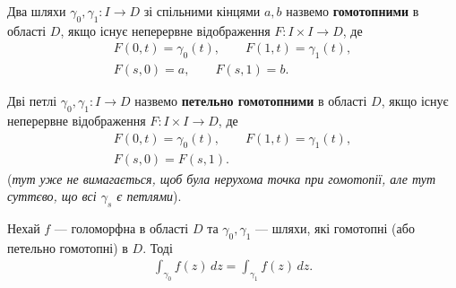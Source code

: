 \documentclass{math_library}
\begin{document}
\begin{definition}
Два шляхи $\gamma_0, \gamma_1 \colon I \to D$ зі спільними кінцями $a,b$ назвемо \textbf{гомотопними} в області $D$, якщо існує неперервне відображення $F \colon I \times I \to D$, де
\begin{align*}
F(0,t) = \gamma_0(t), \qquad F(1,t) = \gamma_1(t), \\
F(s,0) = a,\qquad F(s,1) = b.
\end{align*}
\end{definition}

\begin{definition}
Дві петлі $\gamma_0, \gamma_1 \colon I \to D$ назвемо \textbf{петельно гомотопними} в області $D$, якщо існує неперервне відображення $F \colon I \times I \to D$, де
\begin{align*}
F(0,t) = \gamma_0(t), \qquad F(1,t) = \gamma_1(t), \\
F(s,0) = F(s,1).
\end{align*}
(\textit{тут уже не вимагається, щоб була нерухома точка при гомотопії, але тут суттєво, що всі $\gamma_s$ є петлями}).
\end{definition}

\begin{theorem}
Нехай $f$ --- голоморфна в області $D$ та $\gamma_0,\gamma_1$ --- шляхи, які гомотопні (або петельно гомотопні) в $D$. Тоді
\begin{align*}
\int_{\gamma_0} f(z)\,dz = \int_{\gamma_1} f(z)\,dz.
\end{align*}
\end{theorem}
\end{document}
